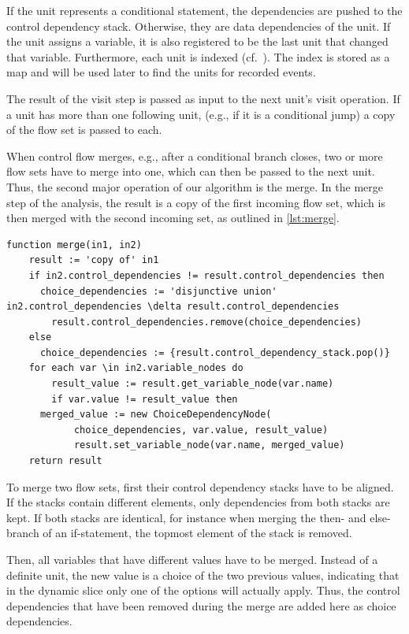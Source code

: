 If the unit represents a conditional statement, the dependencies are pushed to the control dependency stack.
Otherwise, they are data dependencies of the unit.
If the unit assigns a variable, it is also registered to be the last unit that changed that variable.
Furthermore, each unit is indexed (cf.~).
The index is stored as a map and will be used later to find the units for recorded events.

The result of the visit step is passed as input to the next unit's visit operation.
If a unit has more than one following unit, (e.g., if it is a conditional jump) a copy of the flow set is passed to each.

When control flow merges, e.g., after a conditional branch closes, two or more flow sets have to merge into one, which can then be passed to the next unit.
Thus, the second major operation of our algorithm is the merge. 
In the merge step of the analysis, the result is a copy of the first incoming flow set, which is then merged with the second incoming set, as outlined in \cref{lst:merge}.

\begin{lstlisting}[firstnumber=1,float,caption={The algorithm of the merge operation.},stepnumber=5,label=lst:merge,gobble=0,language=algorithm,tabsize=2]
function merge(in1, in2)
	result := 'copy of' in1
	if in2.control_dependencies != result.control_dependencies then
	  choice_dependencies := 'disjunctive union' in2.control_dependencies \delta result.control_dependencies
		result.control_dependencies.remove(choice_dependencies)
	else
	  choice_dependencies := {result.control_dependency_stack.pop()}
	for each var \in in2.variable_nodes do
		result_value := result.get_variable_node(var.name)
		if var.value != result_value then
      merged_value := new ChoiceDependencyNode(
            choice_dependencies, var.value, result_value)
			result.set_variable_node(var.name, merged_value)
	return result
\end{lstlisting}

To merge two flow sets, first their control dependency stacks have to be aligned.
If the stacks contain different elements, only dependencies from both stacks are kept.
If both stacks are identical, for instance when merging the then- and else-branch of an if-statement, the topmost element of the stack is removed.

Then, all variables that have different values have to be merged.
Instead of a definite unit, the new value is a choice of the two previous values, indicating that in the dynamic slice only one of the options will actually apply.
Thus, the control dependencies that have been removed during the merge are added here as choice dependencies.

